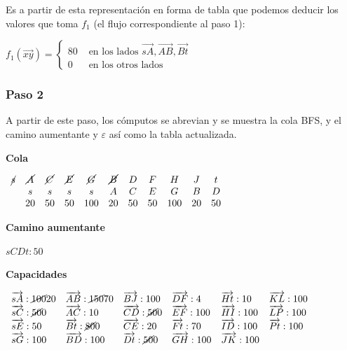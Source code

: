 \documentclass[10pt,a4paper]{article}
\begin{document}
Es a partir de esta representación en forma de tabla que podemos deducir los valores que toma $f_1$ (el flujo correspondiente al paso 1):

\begin{center}
$f_1(\overrightarrow{xy}) = \begin{cases} 80 & \text{ en los lados } \overrightarrow{sA}, \overrightarrow{AB},\overrightarrow{Bt}\\ 0 & \text{ en los otros lados} \end{cases} $
\end{center}

\subsubsection*{Paso 2}

A partir de este paso, los cómputos se abrevian y se muestra la cola BFS, y el camino aumentante y $\varepsilon$ así como la tabla actualizada.

\textbf{Cola}

$\begin{array}{ccccccccccc} \cancel{s} & \cancel{A} & \cancel{C} & \cancel{E} & \cancel{G} & \cancel{B} & D& F& H &J &t\\ & s & s & s & s & A & C & E&G&B &D\\ & 20 & 50 & 50 & 100 & 20 & 50 &50 & 100 & 20 &50 \end{array}$

\textbf{Camino aumentante}

$sCDt:50$

\textbf{Capacidades}

$\begin{array}{llllll} \overrightarrow{sA}: \cancel{100}20& \overrightarrow{AB}: \cancel{150} 70&\overrightarrow{BJ}: 100&\overrightarrow{DF}: 4&\overrightarrow{Ht}: 10&\overrightarrow{KL}: 100\\ \overrightarrow{sC}: \cancel{50}0& \overrightarrow{AC}: 10&\overrightarrow{CD}: \cancel{50}0&\overrightarrow{EF}: 100&\overrightarrow{HI}: 100&\overrightarrow{LP}: 100\\ \overrightarrow{sE}: 50& \overrightarrow{Bt}: \cancel{80} 0&\overrightarrow{CE}: 20&\overrightarrow{Ft}: 70&\overrightarrow{ID}: 100&\overrightarrow{Pt}: 100\\ \overrightarrow{sG}: 100& \overrightarrow{BD}: 100&\overrightarrow{Dt}: \cancel{50}0&\overrightarrow{GH}: 100&\overrightarrow{JK}: 100&\\ \end{array}$
\end{document}
